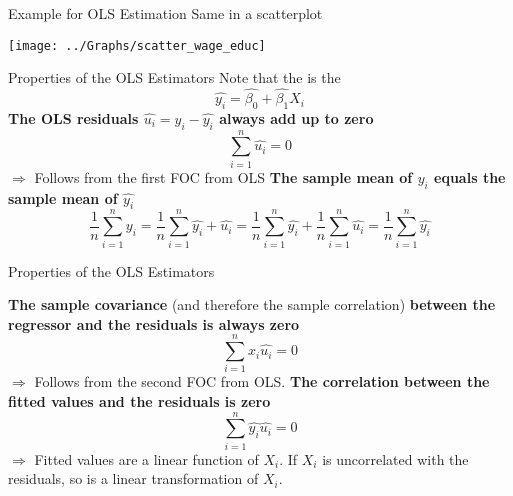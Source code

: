 \begin{frame}{Example for OLS Estimation}
Same in a scatterplot
\begin{center}
\texttt{[image: ../Graphs/scatter\_wage\_educ]}
\end{center}
\end{frame}


\begin{frame}{Properties of the OLS Estimators}
Note that the  is the  
\begin{equation}
\widehat{y_i}=\widehat{\beta_0}+ \widehat{\beta_1} X_i
\label{eq16}
\end{equation}
\vfill
\pause
{} 
\vfill
{} \textbf{The OLS residuals $\widehat{u_i}=y_i-\widehat{y_i}$ always add up to zero}
\begin{equation}
\displaystyle\sum_{i=1}^n \widehat{u_i}=0
\label{eq17}
\end{equation}
$\Rightarrow$ Follows from the first FOC from OLS
\vfill
\pause
{} \textbf{The sample mean of $y_i$ equals the sample mean of $\widehat{y_i}$}
\begin{equation}
\frac{1}{n}\displaystyle\sum_{i=1}^n y_i = \frac{1}{n}\displaystyle\sum_{i=1}^n \widehat{y_i} + \widehat{u_i}=  \frac{1}{n}\displaystyle\sum_{i=1}^n \widehat{y_i} + \frac{1}{n}\displaystyle\sum_{i=1}^n \widehat{u_i}=\frac{1}{n}\displaystyle\sum_{i=1}^n \widehat{y_i}
\label{eq18}
\end{equation}
\end{frame}




\begin{frame}{Properties of the OLS Estimators}

 \textbf{The sample covariance} (and therefore the sample correlation) \textbf{between the regressor and the residuals is always zero}
\begin{equation}
\displaystyle\sum_{i=1}^n x_i \widehat{u_i}=0
\label{eq19}
\end{equation}
$\Rightarrow$ Follows from the second FOC from OLS. 
\vfill
\pause
{} \textbf{The correlation between the fitted values and the residuals is zero}
\begin{equation}
\displaystyle\sum_{i=1}^n \widehat{y_i} \widehat{u_i}=0
\label{eq20}
\end{equation}
$\Rightarrow$ Fitted values are a linear function of $X_i$. If $X_i$ is uncorrelated with the residuals, so is a linear transformation of $X_i$.
\end{frame}


